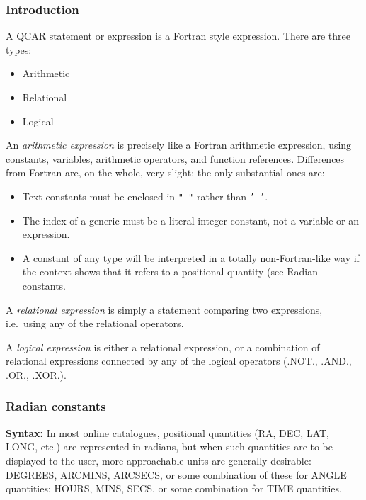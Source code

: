 \subsubsection {Introduction}
A QCAR statement or expression is a Fortran style expression.
There are  three types:
\begin{itemize}
\item Arithmetic
\item Relational
\item Logical
\end{itemize}
An {\em arithmetic expression} is precisely like a Fortran arithmetic
expression, using constants, variables, arithmetic operators, and function
references.
Differences from Fortran are, on the whole, very slight; the only substantial
ones are:
\begin{itemize}
\item Text constants must be enclosed in {\tt " "} rather than {\tt ' '}.
\item The index of a generic must be a literal integer constant, not
a variable or an expression.
\item A constant of any type will be interpreted in a totally non-Fortran-like
way if the context shows that it refers to a positional quantity (see Radian
constants.
\end{itemize}
A {\em relational expression} is simply a statement comparing two expressions,
i.e.\ using any of the relational operators.

A {\em logical expression} is either a relational expression, or a combination
of relational expressions connected by any of the logical operators
(.NOT., .AND., .OR., .XOR.).
\subsubsection {Radian constants}
{\bf Syntax:} In most online catalogues, positional quantities (RA, DEC, LAT, 
LONG, etc.) are represented in radians, but when such quantities are to be 
displayed to the user, more approachable units are generally desirable: 
DEGREES, ARCMINS, ARCSECS, or some combination of these for ANGLE quantities; 
HOURS, MINS, SECS, or some combination for TIME quantities.

